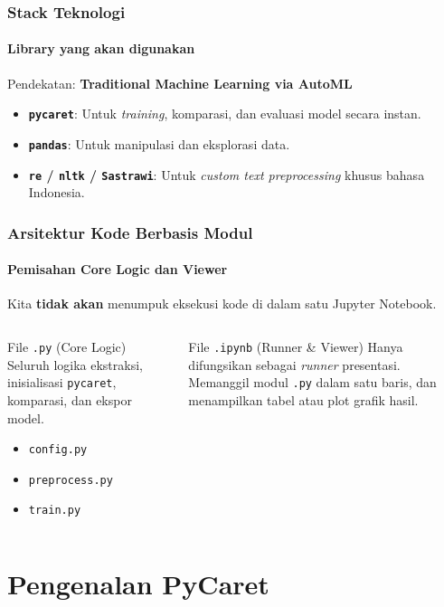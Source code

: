 \documentclass[t,aspectratio=169,xcolor=dvipsnames]{beamer}
\begin{document}
\begin{frame}
    \frametitle{Stack Teknologi}
    \framesubtitle{Library yang akan digunakan}
    \small
    Pendekatan: \textbf{Traditional Machine Learning via AutoML}
    \vspace{0.3cm}
    \begin{itemize}
        \item \textbf{\texttt{pycaret}}: Untuk \textit{training}, komparasi, dan evaluasi model secara instan.
        \item \textbf{\texttt{pandas}}: Untuk manipulasi dan eksplorasi data.
        \item \textbf{\texttt{re} / \texttt{nltk} / \texttt{Sastrawi}}: Untuk \textit{custom text preprocessing} khusus bahasa Indonesia.
    \end{itemize}
\end{frame}

\begin{frame}
    \frametitle{Arsitektur Kode Berbasis Modul}
    \framesubtitle{Pemisahan Core Logic dan Viewer}
    \small
    Kita \textbf{tidak akan} menumpuk eksekusi kode di dalam satu Jupyter Notebook.
    \begin{columns}[T]
        \begin{block}{File \texttt{.py} (Core Logic)}
            Seluruh logika ekstraksi, inisialisasi \texttt{pycaret}, komparasi, dan ekspor model.
            \begin{itemize}
                \item \texttt{config.py}
                \item \texttt{preprocess.py}
                \item \texttt{train.py}
            \end{itemize}
        \end{block}

        \begin{alertblock}{File \texttt{.ipynb} (Runner \& Viewer)}
            Hanya difungsikan sebagai \textit{runner} presentasi. Memanggil modul \texttt{.py} dalam satu baris, dan menampilkan tabel atau plot grafik hasil.
        \end{alertblock}
    \end{columns}
\end{frame}

\section{Pengenalan PyCaret}
\end{document}
